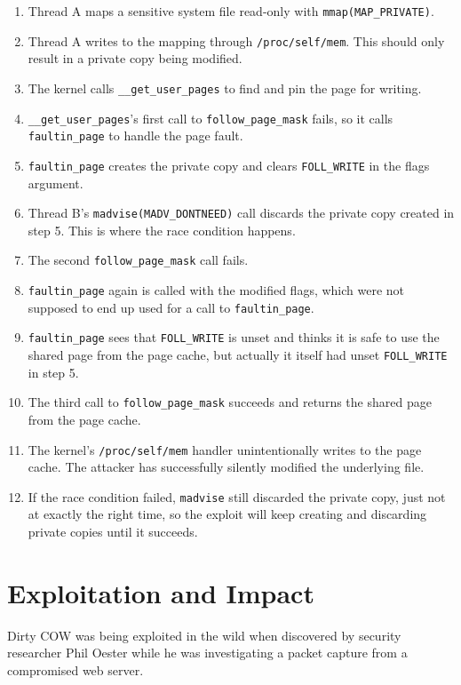 \documentclass[a4paper,10pt,twocolumn,english]{article}
\newcommand{\code}[1]{\texttt{#1}}
\begin{document}
\begin{enumerate}[itemsep=2pt]
	\item Thread A maps a sensitive system file read-only with \code{mmap(MAP\_PRIVATE)}.
	\item Thread A writes to the mapping through \code{/proc/self/mem}. This should only result in a private copy being modified.
	\item The kernel calls \code{\_\_get\_user\_pages} to find and pin the page for writing.
	\item \code{\_\_get\_user\_pages}'s first call to \code{follow\_page\_mask} fails, so it calls \code{faultin\_page} to handle the page fault.
	\item \code{faultin\_page} creates the private copy and clears \code{FOLL\_WRITE} in the flags argument.
	\item Thread B's \code{madvise(MADV\_DONTNEED)} call discards the private copy created in step 5. This is where the race condition happens.
	\item The second \code{follow\_page\_mask} call fails.
	\item \code{faultin\_page} again is called with the modified flags, which were not supposed to end up used for a call to \code{faultin\_page}.
	\item \code{faultin\_page} sees that \code{FOLL\_WRITE} is unset and thinks it is safe to use the shared page from the page cache, but actually it itself had unset \code{FOLL\_WRITE} in step 5.
	\item The third call to \code{follow\_page\_mask} succeeds and returns the shared page from the page cache.
	\item The kernel's \code{/proc/self/mem} handler unintentionally writes to the page cache. The attacker has successfully silently modified the underlying file.
	\item If the race condition failed, \code{madvise} still discarded the private copy, just not at exactly the right time, so the exploit will keep creating and discarding private copies until it succeeds.
\end{enumerate}

\section{Exploitation and Impact}

Dirty COW was being exploited in the wild when discovered by security researcher Phil Oester while he was investigating a packet capture from a compromised web server. \cite{arstechnica2016dirtycow}
\end{document}
